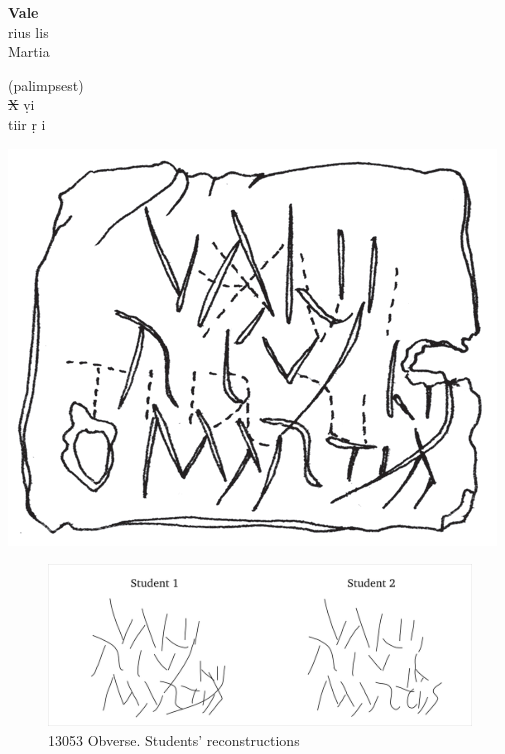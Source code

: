 \documentclass[amsthm,ebook]{saparticle}
\begin{document}
\begin{minipage}[t]{0.3\textwidth}
\textbf{Vale}\\
rius lis\\
Martia\\
\end{minipage}
\begin{minipage}[t]{0.3\textwidth}
(palimpsest)\\
\sout{X} \d{v}i\\
tiir \d{r} i\\
\end{minipage}
\begin{minipage}[c]{0.3\textwidth}
\includegraphics[scale=0.25]{EAGLE16lameetalteaching-img011a.png}
\end{minipage}



\begin{figure}[!bp]
\centering
\includegraphics[scale=0.25]{EAGLE16lameetalteaching-img010.png}
\caption{13053 Obverse. Students' reconstructions}
\label{fig:3}
\end{figure}
\end{document}
